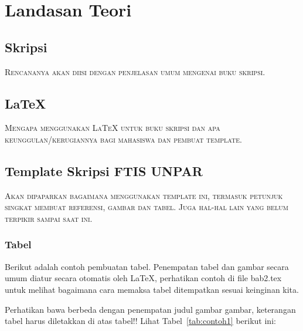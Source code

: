 \chapter{Landasan Teori}
\label{chap:teori}

\section{Skripsi}
\label{sec:skripsi} 

\textsc{
Rencananya akan diisi dengan penjelasan umum mengenai buku skripsi.
}

\kant[11]

\section{\LaTeX}
\label{sec:latex}

\textsc{
Mengapa menggunakan \LaTeX{} untuk buku skripsi dan apa keunggulan/kerugiannya bagi mahasiswa dan pembuat template. 
}

\kant[12]


\section{Template Skripsi FTIS UNPAR}
\label{sec:template}
 
 \textsc{
 Akan dipaparkan bagaimana menggunakan template ini, termasuk petunjuk singkat membuat referensi, gambar dan tabel.
 Juga hal-hal lain yang belum terpikir sampai saat ini. 
 }
 
 \kant[13]

\subsection{Tabel}  
 
Berikut adalah contoh pembuatan tabel. 
Penempatan tabel dan gambar secara umum diatur secara otomatis oleh \LaTeX{}, perhatikan contoh di file bab2.tex untuk melihat bagaimana cara memaksa tabel ditempatkan sesuai keinginan kita.

Perhatikan bawa berbeda dengan penempatan judul gambar gambar, keterangan tabel harus diletakkan di atas tabel!!
Lihat Tabel~\ref{tab:contoh1} berikut ini:

